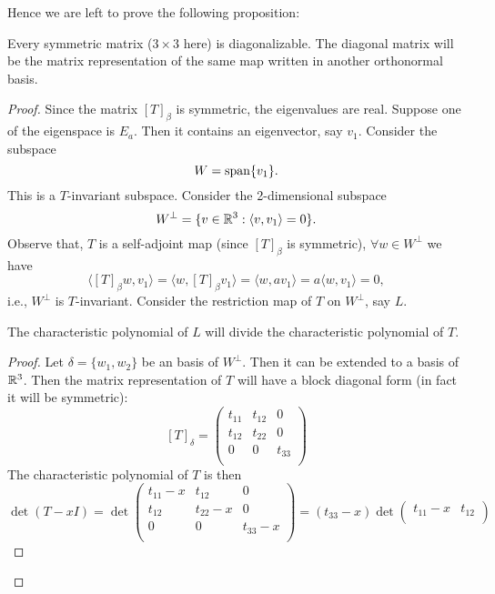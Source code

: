 \documentclass[11pt, a4paper, abstract=true]{scrartcl}
\begin{document}
\begin{soln}
    Hence we are left to prove the following proposition:
    \begin{proposition}
        Every symmetric matrix (\(3 \times 3\) here) is diagonalizable. The diagonal matrix will be the matrix representation of the same map written in another orthonormal basis.
    \end{proposition}
    \begin{proof}
        Since the matrix \([T]_{\beta}\) is symmetric, the eigenvalues are real. Suppose one of the eigenspace is \(E_a\). Then it contains an eigenvector, say \(v_1\). Consider the subspace \[W = \operatorname{span} \{v_1\}.\] This is a \(T\)-invariant subspace. Consider the 2-dimensional subspace \[W^{\perp} = \{v \in \mathbb R^3 : \langle v, v_1 \rangle = 0\}.\] Observe that, \(T\) is a self-adjoint map (since \([T]_{\beta}\) is symmetric), \(\forall w \in W^\perp\) we have
        \[\langle [T]_{\beta}w, v_1 \rangle = \langle w, [T]_{\beta}v_1 \rangle = \langle w, a v_1 \rangle = a \langle w, v_1 \rangle = 0,\] i.e., \(W^{\perp}\) is \(T\)-invariant. Consider the restriction map of \(T\) on \(W^\perp\), say \(L\).
        \begin{lemma}
            The characteristic polynomial of \(L\) will divide the characteristic polynomial of \(T\).
        \end{lemma}
        \begin{proof}
            Let \(\delta = \{w_1, w_2\}\) be an basis of \(W^\perp\). Then it can be extended to a basis of \(\mathbb R^3\). Then the matrix representation of \(T\) will have a block diagonal form (in fact it will be symmetric): \[[T]_{\delta} = 
            \begin{pmatrix}
                t_{11} & t_{12} & 0 \\
                t_{12} & t_{22} & 0 \\
                0 & 0 & t_{33} \\
            \end{pmatrix}
            \]
            The characteristic polynomial of \(T\) is then \[\det (T - x I) = \det 
            \begin{pmatrix}
                t_{11} - x & t_{12} & 0 \\
                t_{12} & t_{22} -x & 0 \\
                0 & 0 & t_{33} -x \\
            \end{pmatrix}
            = (t_{33} - x) \det
            \begin{pmatrix}
                t_{11} - x & t_{12} \\

\end{pmatrix}\]
\end{proof}
\end{proof}
\end{soln}
\end{document}
